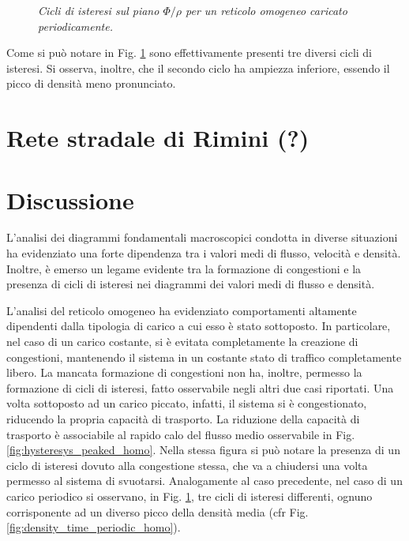 \documentclass[../main.tex]{subfiles}
\begin{document}
\begin{figure}[H]
    \centering
    \caption[Isteresi per un reticolo omogeneo caricato periodicamente]{\emph{Cicli di isteresi sul piano $\Phi/\rho$ per un reticolo omogeneo caricato periodicamente.}}
    \label{fig:hysteresys_periodic_homo}
\end{figure}
Come si pu\`o notare in Fig. \ref{fig:hysteresys_periodic_homo} sono effettivamente presenti tre diversi cicli di isteresi.
Si osserva, inoltre, che il secondo ciclo ha ampiezza inferiore, essendo il picco di densit\`a meno pronunciato.

\section{Rete stradale di Rimini (?)}

\section{Discussione}
L'analisi dei diagrammi fondamentali macroscopici condotta in diverse situazioni ha evidenziato una forte dipendenza tra i valori medi di flusso, velocit\`a e densit\`a.
Inoltre, \`e emerso un legame evidente tra la formazione di congestioni e la presenza di cicli di isteresi nei diagrammi dei valori medi di flusso e densit\`a.


L'analisi del reticolo omogeneo ha evidenziato comportamenti altamente dipendenti dalla tipologia di carico a cui esso \`e stato sottoposto.
In particolare, nel caso di un carico costante, si \`e evitata completamente la creazione di congestioni, mantenendo il sistema in un costante stato di traffico completamente libero.
La mancata formazione di congestioni non ha, inoltre, permesso la formazione di cicli di isteresi, fatto osservabile negli altri due casi riportati.
Una volta sottoposto ad un carico piccato, infatti, il sistema si \`e congestionato, riducendo la propria capacit\`a di trasporto.
La riduzione della capacit\`a di trasporto \`e associabile al rapido calo del flusso medio osservabile in Fig. \ref{fig:hysteresys_peaked_homo}.
Nella stessa figura si pu\`o notare la presenza di un ciclo di isteresi dovuto alla congestione stessa, che va a chiudersi una volta permesso al sistema di svuotarsi.
Analogamente al caso precedente, nel caso di un carico periodico si osservano, in Fig. \ref{fig:hysteresys_periodic_homo}, tre cicli di isteresi differenti, ognuno corrisponente ad un diverso picco della densit\`a media (cfr Fig. \ref{fig:density_time_periodic_homo}).
\end{document}
